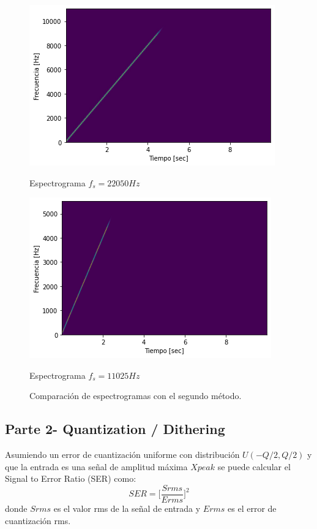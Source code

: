\documentclass[a4paper]{article}
\begin{document}
\begin{figure}[h]
\begin{minipage}[b]{0.5\linewidth}
\centering
\includegraphics[width=\linewidth]{caso1.png}
\caption{Espectrograma $f_s = 22050Hz$ }
\label{f:figura1}
\end{minipage}
\hspace{0.5cm}
\begin{minipage}[b]{0.5\linewidth}
\centering
\includegraphics[width=\linewidth]{caso2.png}
\caption{Espectrograma $f_s = 11025Hz$}
\label{f:figura2}
\end{minipage}
\caption{Comparación de espectrogramas con el segundo método.}
\label{comparacion3}
\end{figure}



\subsection{Parte 2- Quantization / Dithering}
Asumiendo un error de cuantización uniforme con distribución $U(-Q/2,Q/2)$ y que la entrada es una señal de amplitud máxima $Xpeak$ se puede calcular el Signal to Error Ratio (SER) como:
$$
SER = \bigg[\frac{Srms}{Erms}\bigg]^2
$$
donde $Srms$ es el valor rms de la señal de entrada y $Erms$ es el error de cuantización rms. 
\end{document}
